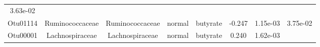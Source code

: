 \documentclass[11pt,]{article}
\begin{document}
\begin{longtable}[]{@{}cccccccc@{}}
\begin{minipage}[t]{0.08\columnwidth}
3.63e-02\strut
\end{minipage}\tabularnewline
\begin{minipage}[t]{0.08\columnwidth}\centering\strut
Otu01114\strut
\end{minipage} & \begin{minipage}[t]{0.15\columnwidth}\centering\strut
Ruminococcaceae\strut
\end{minipage} & \begin{minipage}[t]{0.15\columnwidth}\centering\strut
Ruminococcaceae\strut
\end{minipage} & \begin{minipage}[t]{0.08\columnwidth}\centering\strut
normal\strut
\end{minipage} & \begin{minipage}[t]{0.09\columnwidth}\centering\strut
butyrate\strut
\end{minipage} & \begin{minipage}[t]{0.07\columnwidth}\centering\strut
-0.247\strut
\end{minipage} & \begin{minipage}[t]{0.08\columnwidth}\centering\strut
1.15e-03\strut
\end{minipage} & \begin{minipage}[t]{0.08\columnwidth}\centering\strut
3.75e-02\strut
\end{minipage}\tabularnewline
\begin{minipage}[t]{0.08\columnwidth}\centering\strut
Otu00001\strut
\end{minipage} & \begin{minipage}[t]{0.15\columnwidth}\centering\strut
Lachnospiraceae\strut
\end{minipage} & \begin{minipage}[t]{0.15\columnwidth}\centering\strut
Lachnospiraceae\strut
\end{minipage} & \begin{minipage}[t]{0.08\columnwidth}\centering\strut
normal\strut
\end{minipage} & \begin{minipage}[t]{0.09\columnwidth}\centering\strut
butyrate\strut
\end{minipage} & \begin{minipage}[t]{0.07\columnwidth}\centering\strut
0.240\strut
\end{minipage} & \begin{minipage}[t]{0.08\columnwidth}\centering\strut
1.62e-03\strut
\end{minipage} & \begin{minipage}[t]{0.08\columnwidth}\centering\strut

\end{minipage}
\end{longtable}
\end{document}
